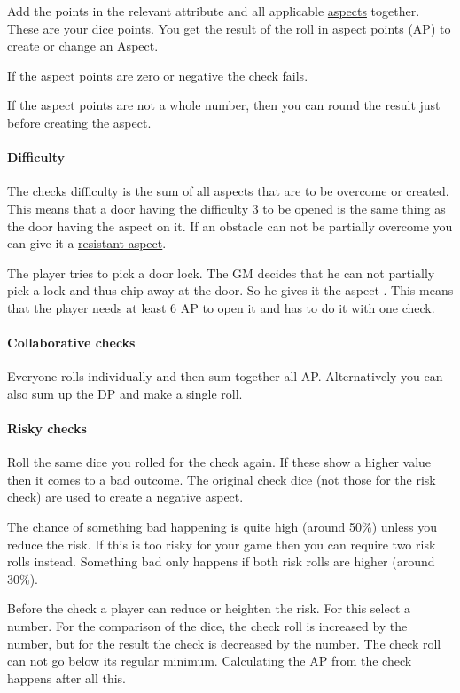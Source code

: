 \documentclass[11pt]{article}
\begin{document}
{Add the points in the relevant attribute and all applicable \hyperref[sec:orgfa4521d]{aspects} together. These are your dice points. You get the result of the roll in aspect points (AP) to create or change an Aspect.

If the aspect points are zero or negative the check fails.

If the aspect points are not a whole number, then you can round the result just before creating the aspect.
\paragraph*{Difficulty}
\label{sec:orga02ef0d}
The checks difficulty is the sum of all aspects that are to be overcome or created. This means that a door having the difficulty 3 to be opened is the same thing as the door having the aspect  on it. If an obstacle can not be partially overcome you can give it a \hyperref[sec:orgf0a3c53]{resistant aspect}.

\begin{pwexample}
The player tries to pick a door lock. The GM decides that he can not partially pick a lock and thus chip away at the door. So he gives it the aspect . This means that the player needs at least 6 AP to open it and has to do it with one check.
\end{pwexample}
\paragraph*{Collaborative checks}
\label{sec:orgb3fe083}
Everyone rolls individually and then sum together all AP. Alternatively you can also sum up the DP and make a single roll.
\paragraph*{Risky checks}
\label{sec:orgc05fe30}
Roll the same dice you rolled for the check again. If these show a higher value then it comes to a bad outcome. The original check dice (not those for the risk check) are used to create a negative aspect.

The chance of something bad happening is quite high (around 50\%) unless you reduce the risk. If this is too risky for your game then you can require two risk rolls instead. Something bad only happens if both risk rolls are higher (around 30\%). 

Before the check a player can reduce or heighten the risk. For this select a number. For the comparison of the dice, the check roll is increased by the number, but for the result the check is decreased by the number. The check roll can not go below its regular minimum. Calculating the AP from the check happens after all this.
}
\end{document}
